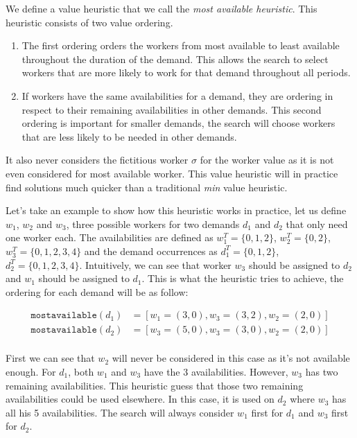 \documentclass[../../thesis.tex]{subfiles}
\begin{document}
We define a value heuristic that we call the \emph{most available heuristic}. 
This heuristic consists of two value ordering.
\begin{enumerate}
  \item The first ordering orders the workers from most available to least available throughout the duration of the demand.
        This allows the search to select workers that are more likely to work for that demand throughout all periods.
  \item If workers have the same availabilities for a demand, they are ordering in respect to their remaining availabilities in other demands. This 
        second ordering is important for smaller demands, the search will choose workers that are less likely to be needed in other demands.
\end{enumerate}

It also never considers the fictitious worker $\sigma$ for the worker value as it is not even considered 
for most available worker. This value heuristic will in practice find solutions much quicker than a traditional \emph{min} value heuristic.

Let's take an example to show how this heuristic works in practice, let us define 
$w_1$, $w_2$ and $w_3$, three possible workers for two demands $d_1$ and $d_2$ that only need one worker each.
The availabilities are defined as
$w_1^T = \{ 0, 1, 2 \}$, $w_2^T = \{ 0, 2 \}$, $w_3^T = \{ 0, 1, 2, 3, 4\}$ and the demand occurrences as 
$d_1^T = \{ 0, 1, 2 \}$, $d_2^T = \{ 0, 1, 2, 3, 4 \}$. Intuitively, we can see that worker 
$w_3$ should be assigned to $d_2$ and $w_1$ should be assigned to $d_1$. This is what the heuristic tries to achieve, the ordering for each demand will be as follow:

\begin{align*}
  \texttt{mostavailable}(d_1) &= [w_1 = (3, 0), w_3 = (3, 2), w_2 = (2, 0)] \\ 
  \texttt{mostavailable}(d_2) &= [w_3 = (5, 0), w_3 = (3, 0), w_2 = (2, 0)] \\ 
\end{align*}

First we can see that $w_2$ will never be considered in this case as it's not available enough. For $d_1$, both $w_1$ and $w_3$ have the 3 availabilities. However, 
$w_3$ has two remaining availabilities. This heuristic guess that those two remaining availabilities could be used elsewhere. In this case, it is used on $d_2$ where $w_3$ has all his 5 availabilities.
The search will always consider $w_1$ first for $d_1$ and $w_3$ first for $d_2$.
\end{document}
